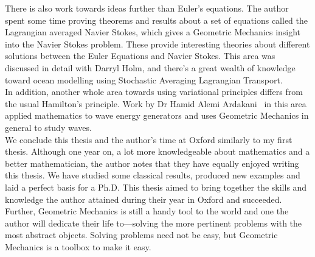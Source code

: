 
\noindent
There is also work towards ideas further than Euler's equations. The author spent some time proving theorems and results about a set of equations called the Lagrangian averaged Navier Stokes, which gives a Geometric Mechanics insight into the Navier Stokes problem. These provide interesting theories about different solutions between the Euler Equations and Navier Stokes. This area was discussed in detail with Darryl Holm, and there's a great wealth of knowledge toward ocean modelling using Stochastic Averaging Lagrangian Transport.\\

\noindent
In addition, another whole area towards using variational principles differs from the usual Hamilton's principle. Work by Dr Hamid Alemi Ardakani~\cite{hamid_sloshing,alemi_ardakani_2019} in this area applied mathematics to wave energy generators and uses Geometric Mechanics in general to study waves.\\

\noindent
We conclude this thesis and the author's time at Oxford similarly to my first thesis. Although one year on, a lot more knowledgeable about mathematics and a better mathematician, the author notes that they have equally enjoyed writing this thesis. We have studied some classical results, produced new examples and laid a perfect basis for a Ph.D. This thesis aimed to bring together the skills and knowledge the author attained during their year in Oxford and succeeded. Further, Geometric Mechanics is still a handy tool to the world and one the author will dedicate their life to—solving the more pertinent problems with the most abstract objects. Solving problems need not be easy, but Geometric Mechanics is a toolbox to make it easy.